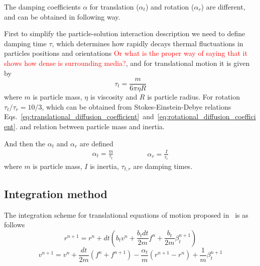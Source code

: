 The damping coefficients $\alpha$ for translation ($\alpha_t$) and rotation ($\alpha_r$) are different, and can be obtained in following way.

First to simplify the particle-solution interaction description we need to define damping time $\tau$, which determines how rapidly decays thermal fluctuations in particles positions and orientations \textcolor{red}{Or what is the proper way of saying that it shows how dense is surrounding media?}, and for translational motion it is given by
\begin{equation}
\label{eq:Translation_damping_time}
	\tau_{t} = \frac{m}{6 \pi \eta R}
\end{equation}
where $m$ is particle mass, $\eta$ is viscosity and $R$ is particle radius. For rotation $\tau_{t} / \tau_{r} = 10/3$, which can be obtained from Stokes-Einstein-Debye relations Eqs.~\eqref{eq:translational_diffusion_coefficient}~and~\eqref{eq:rotational_diffusion_coefficient}. and relation between particle mass and inertia.

And then the $\alpha_t$ and $\alpha_r$ are defined
\begin{equation}
	\begin{aligned}
		\alpha_t = \frac{m}{\tau_t}
	\end{aligned}
	\qquad
	\qquad
	\begin{aligned}
		\alpha_r = \frac{I}{\tau_r}
	\end{aligned}
\end{equation}
where $m$ is particle mass, $I$ is inertia, $\tau_{t,r}$ are damping times.

\subsection{Integration method}
\label{subsec:integration_method}

The integration scheme for translational equations of motion proposed in~\cite{Taylor2013} is as follows
\begin{equation}
\label{eq:tr_coordinate_change}
	r^{n+1} = r^n + dt \left(
	 b_{t} v^n
	 + \frac{b_{t} dt}{2m}f^n
	 + \frac{b_{t}}{2m}\beta_{t}^{n+1}
	\right)
\end{equation}
\begin{equation}
\label{eq:tr_velocity_change}
	v^{n+1} = v^n 
	 + \frac{dt}{2m}\left(f^n + f^{n+1}\right)
	 - \frac{\alpha_{t}}{m}\left(r^{n+1} - r^n\right)
	 + \frac{1}{m}\beta_{t}^{n+1}
\end{equation}

